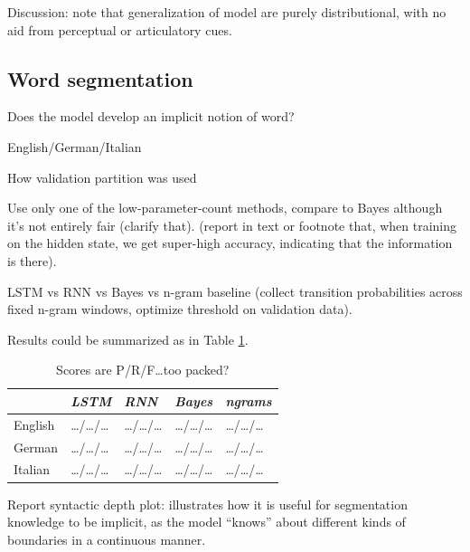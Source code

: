 Discussion: note that generalization of model are purely
distributional, with no aid from perceptual or articulatory cues.


\subsection{Word segmentation}
\label{sec:segmentation}


Does the model develop an implicit notion of word?

English/German/Italian

How validation partition was used

Use only one of the low-parameter-count methods, compare to Bayes
although it's not entirely fair (clarify that). (report in text or
footnote that, when training on the hidden state, we get super-high
accuracy, indicating that the information is there).

LSTM vs RNN vs Bayes vs n-gram baseline (collect transition
probabilities across fixed n-gram windows, optimize threshold on
validation data).

Results could be summarized as in Table \ref{tab:segmentation-results}.


\begin{table}[t]
  \begin{center}
    \begin{tabular}{l|l|l|l|l}
      \multicolumn{1}{c}{}&\emph{LSTM}&\emph{RNN}&\emph{Bayes}&\emph{ngrams}\\
      \hline
      English &\ldots{}/\ldots{}/\ldots & \ldots{}/\ldots{}/\ldots & \ldots{}/\ldots{}/\ldots &\ldots{}/\ldots{}/\ldots\\
      German &\ldots{}/\ldots{}/\ldots & \ldots{}/\ldots{}/\ldots & \ldots{}/\ldots{}/\ldots &\ldots{}/\ldots{}/\ldots\\
      Italian &\ldots{}/\ldots{}/\ldots & \ldots{}/\ldots{}/\ldots & \ldots{}/\ldots{}/\ldots &\ldots{}/\ldots{}/\ldots\\
    \end{tabular}
  \end{center}
  \caption{\label{tab:segmentation-results} Scores are P/R/F\ldots too packed?}
\end{table}

Report syntactic depth plot: illustrates how it is useful for
segmentation knowledge to be implicit, as the model ``knows'' about
different kinds of boundaries in a continuous manner.






